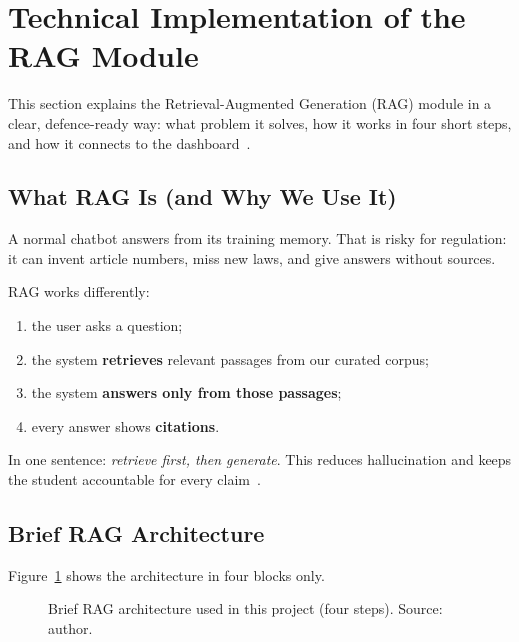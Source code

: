 \section{Technical Implementation of the RAG Module}
\label{sec:rag}

This section explains the Retrieval-Augmented Generation (RAG) module in a clear,
defence-ready way: what problem it solves, how it works in four short steps, and how
it connects to the dashboard~\cite{lewis2020rag}.

\subsection{What RAG Is (and Why We Use It)}
\label{sec:rag-why}

A normal chatbot answers from its training memory. That is risky for regulation:
it can invent article numbers, miss new laws, and give answers without sources.

RAG works differently:
\begin{enumerate}[noitemsep]
  \item the user asks a question;
  \item the system \textbf{retrieves} relevant passages from our curated corpus;
  \item the system \textbf{answers only from those passages};
  \item every answer shows \textbf{citations}.
\end{enumerate}

In one sentence: \emph{retrieve first, then generate}. This reduces hallucination and
keeps the student accountable for every claim~\cite{lewis2020rag,karpukhin2020}.

\subsection{Brief RAG Architecture}
\label{sec:rag-arch}

Figure~\ref{fig:rag-arch} shows the architecture in four blocks only.

\begin{figure}[htbp]
\centering
{}
\caption{Brief RAG architecture used in this project (four steps). Source: author.}
\label{fig:rag-arch}
\end{figure}

